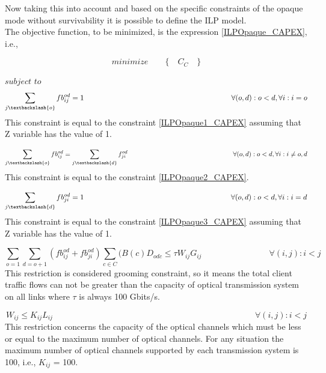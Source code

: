 Now taking this into account and based on the specific constraints of the opaque mode without survivability it is possible to define the ILP model.\\
\newpage
The objective function, to be minimized, is the expression \ref{ILPOpaque_CAPEX}, i.e.,

\begin{equation*}
  minimize \qquad \Big\{ \quad C_C \quad \Big\}
\end{equation*}

$subject$ $to$
\begin{equation}
\sum_{j\textbackslash \{o\}} fb_{ij}^{od} = 1  \qquad \qquad \qquad \qquad \qquad \qquad \qquad \qquad \qquad \qquad
\forall(o,d) : o < d, \forall i: i = o
\label{ILPOpaque1_Surv}
\end{equation}
\noindent
This constraint is equal to the constraint \ref{ILPOpaque1_CAPEX} assuming that Z variable has the value of 1.

\begin{equation}
\sum_{j\textbackslash \{o\}} fb_{ij}^{od} = \sum_{j\textbackslash \{d\}} f_{ji}^{od}   \qquad \qquad \qquad \qquad \qquad \qquad \qquad \qquad
\forall(o,d) : o < d, \forall i: i \neq o,d
\label{ILPOpaque2_Surv}
\end{equation}
\noindent
This constraint is equal to the constraint \ref{ILPOpaque2_CAPEX}.

\begin{equation}
\sum_{j\textbackslash \{d\}} fb_{ji}^{od} = 1  \qquad \qquad \qquad \qquad \qquad \qquad \qquad \qquad \qquad \qquad
\forall(o,d) : o < d, \forall i: i = d
\label{ILPOpaque3_Surv}
\end{equation}
\noindent
This constraint is equal to the constraint \ref{ILPOpaque3_CAPEX} assuming that Z variable has the value of 1.

\begin{equation}
\sum_{o=1} \sum_{d=o+1} \left(fb_{ij}^{od} + fb_{ji}^{od}\right) \sum_{c\in C} (B\left(c\right) D_{odc}\leq \tau W_{ij} G_{ij} \qquad \qquad \qquad \qquad
\forall(i,j) : i < j
\label{ILPOpaque4_Surv}
\end{equation}
\noindent
This restriction is considered grooming constraint, so it means the total client traffic flows can not be greater than the capacity of optical transmission system on all links where $\tau$ is always 100 Gbits/s.

\begin{equation}
W_{ij} \leq K_{ij} L_{ij} \qquad  \qquad \qquad \qquad \qquad \qquad \qquad \qquad \qquad \qquad \qquad \qquad \forall(i,j) : i < j
\label{ILPOpaque5_Surv}
\end{equation}
\noindent
This restriction concerns the capacity of the optical channels which must be less or equal to the maximum number of optical channels. For any situation the maximum number of optical channels supported by each transmission system is 100, i.e., $K_{ij}$ = 100.

